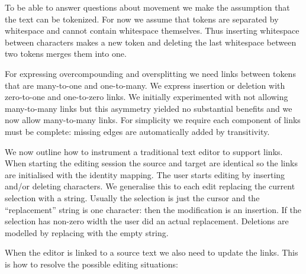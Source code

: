 \documentclass[10pt, a4paper]{article}
\newcommand{\dan}[1]{{\color{Fuchsia}{Dan: #1}}}
\begin{document}
To be
able to answer questions about movement we make the assumption that the text
can be tokenized. For now we assume that tokens are separated by whitespace
and cannot contain whitespace themselves. Thus inserting whitespace between
characters makes a new token and deleting the last whitespace between two
tokens merges them into one.

For expressing overcompounding and oversplitting we need links between tokens
that are many-to-one and one-to-many. We express insertion or deletion with
zero-to-one and one-to-zero links. We initially experimented with not allowing
many-to-many links but this asymmetry yielded no substantial benefits
and we now allow many-to-many links.
For simplicity we require each component
of links must be complete: missing edges are automatically added by
transitivity.

We now outline how to instrument a traditional text editor to support links.
When starting the editing session the source and target are identical so the
links are initialised with the identity mapping. The user starts editing
by inserting and/or deleting characters.
We generalise this to each edit replacing the current selection with a
string. Usually the selection is just the cursor and the ``replacement'' string
is one character: then the modification is an insertion.
If the selection has non-zero width the user did an actual replacement.
Deletions are modelled by replacing with the empty string.

When the editor is linked to a source text we also need to update the links.
This is how to resolve the possible editing situations:

\dan{
Examples in ascii-art for now!
I intend to make proper (small) screenshots of these on Monday.
}
\end{document}
